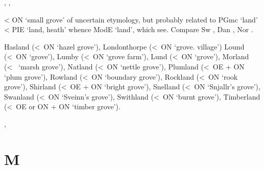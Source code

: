 \documentclass[12pt,letterpaper,oneside,article,draft]{memoir}
\begin{document}
\begin{Lemma}
\begin{Also}
	, , 
\end{Also}
\begin{Etymology}
	< ON  ‘small grove’ of uncertain etymology, but
		probably related to PGmc  ‘land’ < PIE  ‘land, heath’ whence
		ModE  ‘land’, which see.
	Compare
	Sw , Dan , Nor .
\end{Etymology}
\begin{Examples}
	Hasland (<~ON  ‘hazel grove’), Londonthorpe (<~ON  ‘grove. village’) Lound (<~ON  ‘grove’), Lumby (<~ON  ‘grove farm’), Lund (<~ON  ‘grove’), Morland (<~ ‘marsh grove’), Natland (<~ON  ‘nettle grove’), Plumland (<~OE  + ON  ‘plum grove’), Rowland (<~ON  ‘boundary grove’), Rockland (<~ON  ‘rook grove’), Shirland (<~OE  + ON  ‘bright grove’), Snelland (<~ON  ‘Snjallr’s grove’), Swanland (<~ON  ‘Sveinn’s grove’), Swithland (<~ON  ‘burnt grove’), Timberland (<~OE  or ON  + ON  ‘timber grove’).
\end{Examples}
\end{Lemma}

\begin{Lemma}
\begin{Also}
\end{Also}
\end{Lemma}

\begin{Lemma}
\begin{Also}
	, 
\end{Also}
\end{Lemma}

\begin{Lemma}
\begin{Also}
\end{Also}
\end{Lemma}

\section*{M}
\end{document}
